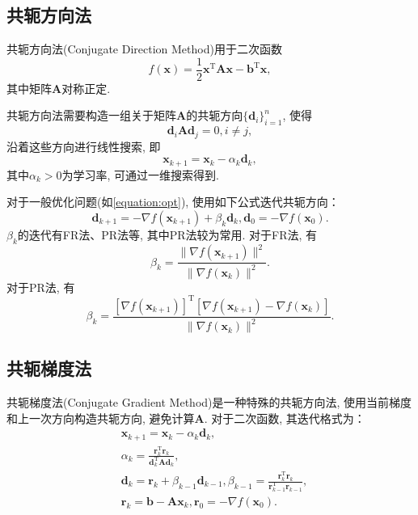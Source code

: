 \subsection{共轭方向法}

共轭方向法(Conjugate Direction Method)用于二次函数
\begin{equation*}
    f(\bm{x})=\frac{1}{2}\bm{x}^\mathrm{T}\bm{Ax}-\bm{b}^\mathrm{T}\bm{x},
\end{equation*}
其中矩阵$\bm{A}$对称正定.

共轭方向法需要构造一组关于矩阵$\bm{A}$的共轭方向$\{\bm{d}_i\}_{i=1}^n$, 使得
\begin{equation*}
    \bm{d}_i\bm{A}\bm{d}_j=0, i\ne j,
\end{equation*}
沿着这些方向进行线性搜索, 即
\begin{equation*}
    \bm{x}_{k+1}=\bm{x}_k-\alpha_k\bm{d}_k,
\end{equation*}
其中$\alpha_k>0$为学习率, 可通过一维搜索得到.

对于一般优化问题(如\cref{equation:opt}), 使用如下公式迭代共轭方向：
\begin{equation*}
    \bm{d}_{k+1}=-\nabla f(\bm{x}_{k+1})+\beta_k\bm{d}_k, \bm{d}_0=-\nabla f(\bm{x}_0).
\end{equation*}
$\beta_k$的迭代有FR法、PR法等, 其中PR法较为常用.
对于FR法, 有
\begin{equation*}
    \beta_k=\frac{\|\nabla f(\bm{x}_{k+1})\|^2}{\|\nabla f(\bm{x}_{k})\|^2}.
\end{equation*}
对于PR法, 有
\begin{equation*}
    \beta_k=\frac{\left[\nabla f(\bm{x}_{k+1})\right]^\mathrm{T}[\nabla f(\bm{x}_{k+1})-\nabla f(\bm{x}_{k})]}{\|\nabla f(\bm{x}_{k})\|^2}.
\end{equation*}

\subsection{共轭梯度法}

共轭梯度法(Conjugate Gradient Method)是一种特殊的共轭方向法, 使用当前梯度和上一次方向构造共轭方向, 避免计算$\bm{A}$.
对于二次函数, 其迭代格式为：
\begin{align*}
    &\bm{x}_{k+1}=\bm{x}_k-\alpha_k\bm{d}_k, \\
    &\alpha_k=\frac{\bm{r}_k^\mathrm{T}\bm{r}_k}{\bm{d}_k^\mathrm{T}\bm{Ad}_k}, \\
    &\bm{d}_k=\bm{r}_k+\beta_{k-1}\bm{d}_{k-1}, \beta_{k-1}=\frac{\bm{r}_k^\mathrm{T}\bm{r}_k}{\bm{r}_{k-1}^\mathrm{T}\bm{r}_{k-1}}, \\
    &\bm{r}_k=\bm{b}-\bm{Ax}_k, \bm{r}_0=-\nabla f(\bm{x}_0).
\end{align*}

